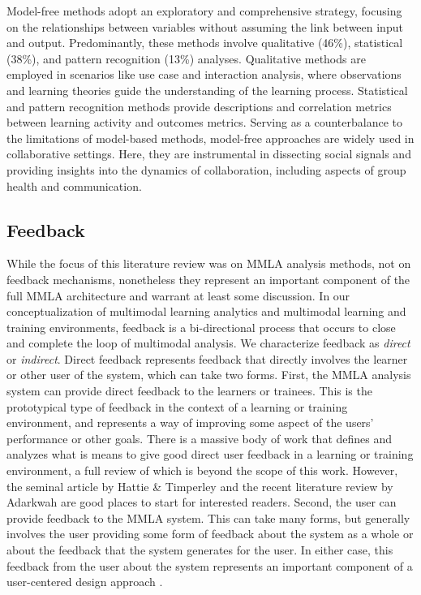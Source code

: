 \documentclass[manuscript,screen,review]{acmart}
\begin{document}
Model-free methods adopt an exploratory and comprehensive strategy, focusing on the relationships between variables without assuming the link between input and output. Predominantly, these methods involve qualitative (46\%), statistical (38\%), and pattern recognition (13\%) analyses. Qualitative methods are employed in scenarios like use case and interaction analysis, where observations and learning theories guide the understanding of the learning process. Statistical and pattern recognition methods provide descriptions and correlation metrics between learning activity and outcomes metrics. Serving as a counterbalance to the limitations of model-based methods, model-free approaches are widely used in collaborative settings. Here, they are instrumental in dissecting social signals and providing insights into the dynamics of collaboration, including aspects of group health and communication.




\subsection{Feedback}\label{subsec:feedback}

While the focus of this literature review was on MMLA analysis methods, not on feedback mechanisms, nonetheless they represent an important component of the full MMLA architecture and warrant at least some discussion. In our conceptualization of multimodal learning analytics and multimodal learning and training environments, feedback is a bi-directional process that occurs to close and complete the loop of multimodal analysis. We characterize feedback as \textit{direct} or \textit{indirect}. Direct feedback represents feedback that directly involves the learner or other user of the system, which can take two forms. First, the MMLA analysis system can provide direct feedback to the learners or trainees. This is the prototypical type of feedback in the context of a learning or training environment, and represents a way of improving some aspect of the users' performance or other goals. There is a massive body of work that defines and analyzes what is means to give good direct user feedback in a learning or training environment, a full review of which is beyond the scope of this work. However, the seminal article by Hattie \& Timperley \cite{hattie2007} and the recent literature review by Adarkwah \cite{Adarkwah2021} are good places to start for interested readers. Second, the user can provide feedback to the MMLA system. This can take many forms, but generally involves the user providing some form of feedback about the system as a whole or about the feedback that the system generates for the user. In either case, this feedback from the user about the system represents an important component of a user-centered design approach \cite{abras2004user}.
\end{document}
